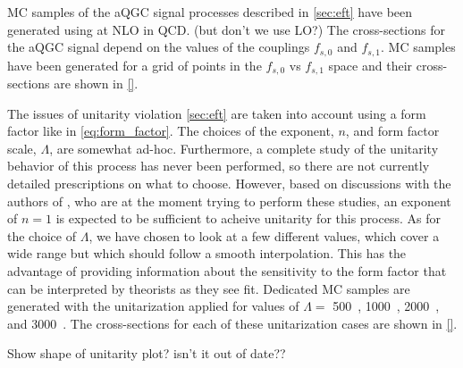 
MC samples of the aQGC signal processes described in \sec\ref{sec:eft}
have been generated using \vbfnlo at NLO in QCD.  (but don't we use LO?)
The cross-sections for the aQGC signal depend on the values
of the couplings $f_{s,0}$ and $f_{s,1}$. MC samples have 
been generated for a grid of points in the $f_{s,0}$ vs $f_{s,1}$ space
and their cross-sections are shown in \fig\ref{}. %


The issues of unitarity violation \sec\ref{sec:eft} are taken
into account using a form factor like in \eqn\eqref{eq:form_factor}.
The choices of the exponent, $n$, and form factor scale, $\Lambda$, 
are somewhat ad-hoc. Furthermore, a complete study of the unitarity
behavior of this process has never been performed, so there are not
currently detailed prescriptions on what to choose. 
However, based on discussions with the authors of \vbfnlo, who
are at the moment trying to perform these studies, an exponent
of $n=1$ is expected to be sufficient to acheive unitarity 
for this process.  As for the choice of $\Lambda$, we have
chosen to look at a few different values, which cover a wide
range but which should follow a smooth interpolation. 
This has the advantage of providing information about the
sensitivity to the form factor that can be interpreted 
by theorists as they see fit. Dedicated MC samples
are generated with the unitarization applied for values
of $\Lambda =$ 500~\GeV, 1000~\GeV, 2000~\GeV, and 3000~\GeV.
The cross-sections for each of these unitarization cases
are shown in \fig\ref{}.

Show shape of unitarity plot? isn't it out of date??
